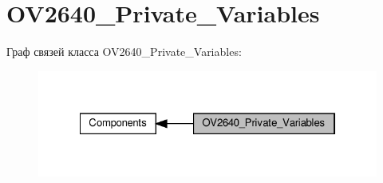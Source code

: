 \hypertarget{group___o_v2640___private___variables}{}\section{O\+V2640\+\_\+\+Private\+\_\+\+Variables}
\label{group___o_v2640___private___variables}
Граф связей класса O\+V2640\+\_\+\+Private\+\_\+\+Variables\+:
\nopagebreak
\begin{figure}[H]
\begin{center}
\leavevmode
\includegraphics[width=322pt]{group___o_v2640___private___variables}
\end{center}
\end{figure}
